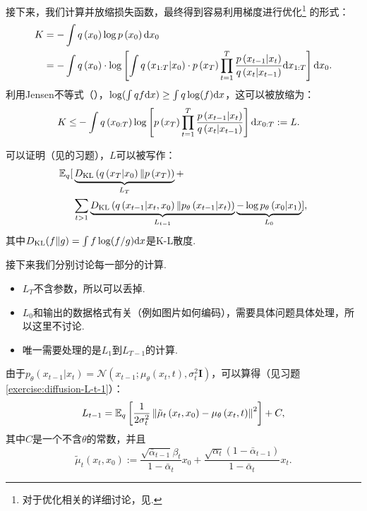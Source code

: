 接下来，我们计算并放缩损失函数，最终得到容易利用梯度进行优化\footnote{对于优化相关的详细讨论，见. }
    的形式：
\[
\begin{aligned}
    K & =-\int q\left(x_{0}\right) \log p\left(x_{0}\right) \mathrm{d} x_{0} \\
    & =-\int q\left(x_{0}\right) \cdot \log \left[\int q\left(x_{1:T} | x_{0}\right) \cdot p\left(x_{T}\right) \prod_{t=1}^T \frac{p\left(x_{t-1} | x_{t}\right)}{q\left(x_{t} | x_{t-1}\right)}\mathrm{d} x_{1:T}\right]\mathrm{d} x_{0}.
\end{aligned}
\]
利用Jensen不等式（），$\log(\int q f\mathrm{d} x)\geq\int q\log(f)\mathrm{d} x$，这可以被放缩为：
\[
\begin{aligned}
    K \leq & -\int q\left(x_{0:T}\right) \log \left[p\left(x_{T}\right) \prod_{t=1}^T \frac{p\left(x_{t-1} | x_{t}\right)}{q\left(x_{t} | x_{t-1}\right)}\right] \mathrm{d} x_{0:T}:=L.
\end{aligned}
\]

可以证明（见的习题），$L$可以被写作：
\[
\begin{aligned}
    \mathbb{E}_q[&\underbrace{D_{\mathrm{KL}}\left(q\left(x_T | x_0\right) \| p\left(x_T\right)\right)}_{L_T}+\\
    &\sum_{t>1} \underbrace{D_{\mathrm{KL}}\left(q\left(x_{t-1} | x_t, x_0\right) \| p_\theta\left(x_{t-1} | x_t\right)\right)}_{L_{t-1}} \underbrace{-\log p_\theta\left(x_0 | x_1\right)}_{L_0}],
\end{aligned}
\]
其中$D_{\mathrm{KL}}(f\|g)=\int f\log(f/g)\mathrm{d} x$是K-L散度. 

接下来我们分别讨论每一部分的计算. 
\begin{itemize}
    \item $L_T$不含参数，所以可以丢掉. 
    \item $L_0$和输出的数据格式有关（例如图片如何编码），需要具体问题具体处理，所以这里不讨论. 
    \item 唯一需要处理的是$L_1$到$L_{T-1}$的计算. 
\end{itemize}

由于$p_\theta\left(x_{t-1}|x_t\right)=\mathcal{N}\left(x_{t-1} ; \mu_\theta\left(x_t, t\right), \sigma_t^2 \mathbf{I}\right)$，可以算得（见习题 \ref{exercise:diffusion-L-t-1}）：
\begin{equation}
L_{t-1}=\mathbb{E}_q\left[\frac{1}{2 \sigma_t^2}\left\|\tilde{\mu}_t\left(x_t, x_0\right)-\mu_\theta\left(x_t, t\right)\right\|^2\right]+C,\label{eq:diffusion-L-t-1}
\end{equation}
其中$C$是一个不含$\theta$的常数，并且
\[
\tilde{\mu}_t\left(x_t, x_0\right):=\frac{\sqrt{\bar{\alpha}_{t-1}} \beta_t}{1-\bar{\alpha}_t} x_0+\frac{\sqrt{\alpha_t}\left(1-\bar{\alpha}_{t-1}\right)}{1-\bar{\alpha}_t} x_t.
\]

